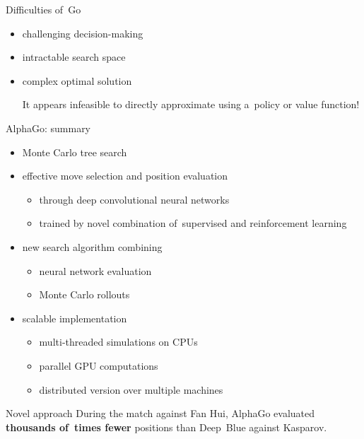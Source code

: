 \documentclass{beamer}
\begin{document}
  {
    \begin{frame}{Difficulties of~Go}
      \begin{itemize}[<+- | alert@+>]
        \item challenging decision-making
        \item intractable search space
        \item complex optimal solution

          {\tiny It appears infeasible to directly approximate using a~policy or value function!}
      \end{itemize}
    \end{frame}

    \begin{frame}{AlphaGo: summary}
      \begin{itemize}[<+- | alert@+>]
        \item Monte Carlo tree search
        \item effective move selection and position evaluation 
          \begin{itemize}[<+- | alert@+>]
            \item through deep convolutional neural networks
            \item trained by novel combination of~supervised and reinforcement learning
          \end{itemize}
        \item new search algorithm combining
          \begin{itemize}[<+- | alert@+>]
            \item neural network evaluation
            \item Monte Carlo rollouts
          \end{itemize}
        \item scalable implementation
          \begin{itemize}[<+- | alert@+>]
            \item multi-threaded simulations on CPUs
            \item parallel GPU computations
            \item distributed version over multiple machines
          \end{itemize}
      \end{itemize}
    \end{frame}

    \begin{frame}{Novel approach}
      \pause
      During the match against Fan Hui, AlphaGo evaluated \textbf{thousands of~times fewer} positions than Deep~Blue against Kasparov.
      \pause


\end{frame}}
\end{document}
